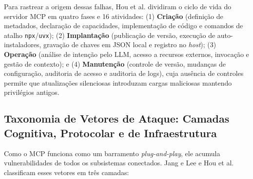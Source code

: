 Para rastrear a origem dessas falhas, Hou et al. \cite{hou2025mcp} dividiram o ciclo de vida do servidor MCP em quatro fases e 16 atividades: (1) \textbf{Criação} (definição de metadados, declaração de capacidades, implementação de código e comandos de atalho \texttt{npx}/\texttt{uvx}); (2) \textbf{Implantação} (publicação de versão, execução de auto-instaladores, gravação de chaves em JSON local e registro no \textit{host}); (3) \textbf{Operação} (análise de intenção pelo LLM, acesso a recursos externos, invocação  e gestão de contexto); e (4) \textbf{Manutenção} (controle de versão, mudanças de configuração, auditoria de acesso e auditoria de logs), cuja ausência de controles permite que atualizações silenciosas introduzam cargas maliciosas mantendo privilégios antigos.

\subsection{Taxonomia de Vetores de Ataque: Camadas Cognitiva, Protocolar e de Infraestrutura}
\label{subsec:taxonomia_ameacas}

Como o MCP funciona como um barramento \textit{plug-and-play}, ele acumula vulnerabilidades de todos os subsistemas conectados. Jang e Lee \cite{jang2026hierarchical} e Hou et al. \cite{hou2025mcp} classificam esses vetores em três camadas:

